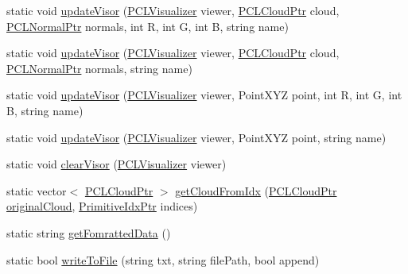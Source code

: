 \begin{DoxyCompactItemize}
static void \hyperlink{classpcm_1_1PCManager_ae65d976eaaf49a2db303e91d30279cb0}{update\-Visor} (\hyperlink{pc__manager_8h_a38c805dbc7ad6f06109b85c8e540817a}{P\-C\-L\-Visualizer} viewer, \hyperlink{pc__primitive_8h_aa14a240c8d999c4f56133c0f70e88783}{P\-C\-L\-Cloud\-Ptr} cloud, \hyperlink{pc__primitive_8h_a1bc38ce8b0c26e5f2d28fae9f3e3ea97}{P\-C\-L\-Normal\-Ptr} normals, int R, int G, int B, string name)
\item 
static void \hyperlink{classpcm_1_1PCManager_a183ac77330de59a04c4de18e3270fbb8}{update\-Visor} (\hyperlink{pc__manager_8h_a38c805dbc7ad6f06109b85c8e540817a}{P\-C\-L\-Visualizer} viewer, \hyperlink{pc__primitive_8h_aa14a240c8d999c4f56133c0f70e88783}{P\-C\-L\-Cloud\-Ptr} cloud, \hyperlink{pc__primitive_8h_a1bc38ce8b0c26e5f2d28fae9f3e3ea97}{P\-C\-L\-Normal\-Ptr} normals, string name)
\item 
static void \hyperlink{classpcm_1_1PCManager_a4e249a3ef952e13bf941ccb90ff6c1f9}{update\-Visor} (\hyperlink{pc__manager_8h_a38c805dbc7ad6f06109b85c8e540817a}{P\-C\-L\-Visualizer} viewer, Point\-X\-Y\-Z point, int R, int G, int B, string name)
\item 
static void \hyperlink{classpcm_1_1PCManager_a684c37d6b0637aa3bb08fe47d67b9fb6}{update\-Visor} (\hyperlink{pc__manager_8h_a38c805dbc7ad6f06109b85c8e540817a}{P\-C\-L\-Visualizer} viewer, Point\-X\-Y\-Z point, string name)
\item 
static void \hyperlink{classpcm_1_1PCManager_a91753945c3d26f6aeee6f0dc6712a7fc}{clear\-Visor} (\hyperlink{pc__manager_8h_a38c805dbc7ad6f06109b85c8e540817a}{P\-C\-L\-Visualizer} viewer)
\item 
static vector$<$ \hyperlink{pc__primitive_8h_aa14a240c8d999c4f56133c0f70e88783}{P\-C\-L\-Cloud\-Ptr} $>$ \hyperlink{classpcm_1_1PCManager_a881ed083a239069699906a669492fc1d}{get\-Cloud\-From\-Idx} (\hyperlink{pc__primitive_8h_aa14a240c8d999c4f56133c0f70e88783}{P\-C\-L\-Cloud\-Ptr} \hyperlink{classpcm_1_1PCManager_a2f7fc5bdae476711dbd0b79fccca14f3}{original\-Cloud}, \hyperlink{pc__primitive_8h_a6ec0f6fbb026ae4b66cac121673c3a8a}{Primitive\-Idx\-Ptr} indices)
\item 
static string \hyperlink{classpcm_1_1PCManager_ac1a98146a63dfd36626a16ed1a50098a}{get\-Fomratted\-Data} ()
\item 
static bool \hyperlink{classpcm_1_1PCManager_a43f25363aa71aafc754a2ae42c832797}{write\-To\-File} (string txt, string file\-Path, bool append)
\end{DoxyCompactItemize}
